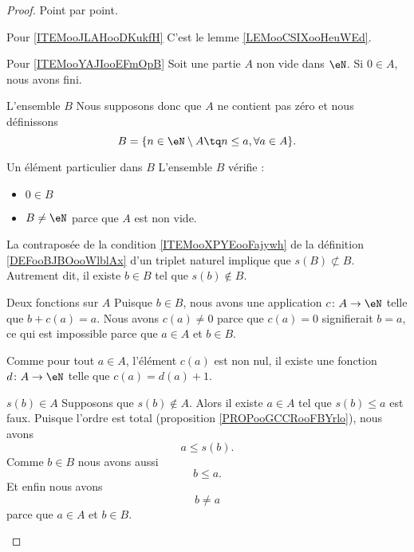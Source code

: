 \begin{proof}
	Point par point.
	\begin{subproof}
		\item[Pour \ref{ITEMooJLAHooDKukfH}]
		C'est le lemme \ref{LEMooCSIXooHeuWEd}.

		\item[Pour \ref{ITEMooYAJIooEFmOpB}]
		Soit une partie \( A\) non vide dans \( \eN\). Si \( 0\in A\), nous avons fini.
		\begin{subproof}
			\item[L'ensemble \( B\)]
			Nous supposons donc que \( A\) ne contient pas zéro et nous définissons
			\begin{equation}
				B=\{ n\in \eN\setminus A\tq n\leq a, \forall a\in A \}.
			\end{equation}
			\item[Un élément particulier dans \( B\)]
			L'ensemble \( B\) vérifie :
			\begin{itemize}
				\item \( 0\in B\)
				\item \( B\neq \eN\) parce que \( A\) est non vide.
			\end{itemize}
			La contraposée de la condition \ref{ITEMooXPYEooFajywh} de la définition \ref{DEFooBJBOooWlblAx} d'un triplet naturel implique que \( s(B)\nsubset B\). Autrement dit, il existe \( b\in B\) tel que \( s(b)\notin B\).

			\item[Deux fonctions sur \( A\)]
			Puisque \( b\in B\), nous avons une application \( c\colon A\to \eN\) telle que \( b+c(a)=a\). Nous avons \( c(a)\neq 0\) parce que \( c(a)=0\) signifierait \( b=a\), ce qui est impossible parce que \( a\in A\) et \( b\in B\).

			Comme pour tout \( a\in A\), l'élément \( c(a)\) est non nul, il existe une fonction \( d\colon A\to \eN\) telle que \( c(a)=d(a)+1\).
			\item[\( s(b)\in A\)]
			Supposons que \( s(b)\notin A\). Alors il existe \( a\in A\) tel que \( s(b)\leq a\) est faux. Puisque l'ordre est total (proposition \ref{PROPooGCCRooFBYrlo}), nous avons
			\begin{equation}        \label{EQooYQSFooPSPJMt}
				a\leq s(b).
			\end{equation}
			Comme \( b\in B\) nous avons aussi
			\begin{equation}        \label{EQooIPAWooDBSJEa}
				b\leq a.
			\end{equation}
			Et enfin nous avons
			\begin{equation}        \label{EQooWFHRooGDSBFD}
				b\neq a
			\end{equation}
			parce que \( a\in A\) et \( b\in B\).


\end{subproof}
\end{subproof}
\end{proof}
